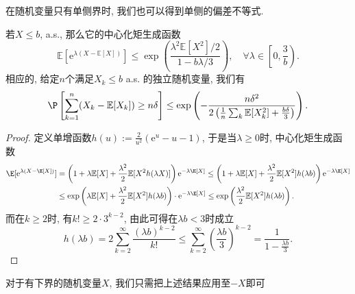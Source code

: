在随机变量只有单侧界时, 我们也可以得到单侧的偏差不等式. 
\begin{proposition}[单侧Bernstein不等式]\label{prop:oneSideBernsteinIneq}
	若$X \leq b$, a.s., 那么它的中心化矩生成函数
	\begin{equation*}
		\mathbb{E}[\mathrm{e}^{\lambda(X - \mathbb{E}[X])}] \leq \exp \left(\frac{\lambda^2 \mathbb{E}[X^2] / 2}{1 - b \lambda / 3}\right), \quad \forall \lambda \in \left[ 0, \frac{3}{b} \right). 
	\end{equation*}
	相应的, 给定$n$个满足$X_k \leq b$ a.s. 的独立随机变量, 我们有
	\begin{equation*}
		\P \left[ \sum_{k=1}^n (X_k - \mathbb{E}[X_k]) \geq n \delta \right]
		\leq \exp \left(- \frac{n \delta^2}{2\left( \frac{1}{n} \sum_k \mathbb{E}[X_k^2] + \frac{b \delta}{3} \right)} \right). 
	\end{equation*}
\end{proposition}
\begin{proof}
	定义单增函数$h(u) := \frac{2}{u^2} (\mathrm{e}^u - u - 1)$, 于是当$\lambda \geq 0$时, 中心化矩生成函数
	\begin{align*}
		\E[\mathrm{e}^{\lambda (X - \E[X])}] 
		& = \left(1 + \lambda \mathbb{E}[X] + \frac{\lambda^2}{2} \mathbb{E}[X^2 h(\lambda X)]\right) \mathrm{e}^{-\lambda \E[X]}
		\leq  \left( 1 + \lambda \mathbb{E}[X] + \frac{\lambda^2}{2} \mathbb{E}[X^2] h(\lambda b) \right) \mathrm{e}^{-\lambda \E[X]} \\
		& \leq  \exp\left(\lambda \mathbb{E}[X] + \frac{\lambda^2}{2} \mathbb{E}[X^2] h(\lambda b)\right) \cdot \mathrm{e}^{-\lambda \E[X]}
		\leq \exp\left(\frac{\lambda^2}{2} \mathbb{E}[X^2] h(\lambda b)\right).
	\end{align*}
	而在$k \geq 2$时, 有$k! \geq 2 \cdot 3^{k-2}$, 由此可得在$\lambda b < 3$时成立
	\begin{equation*}
		h(\lambda b) 
		= 2 \sum_{k=2}^{\infty} \frac{(\lambda b)^{k-2}}{k!} 
		\leq \sum_{k=2}^{\infty} \left(\frac{\lambda b}{3}\right)^{k-2}
		= \frac{1}{1 - \frac{\lambda b}{3}}. 
	\end{equation*}
\end{proof}
\begin{remark}
	对于有下界的随机变量$X$, 我们只需把上述结果应用至$-X$即可
\end{remark}


